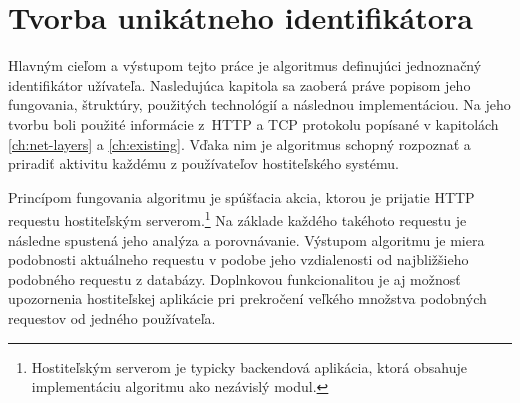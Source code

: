 \documentclass[
  printed, %
  table,   %
  lof,     %
  nolot,   %
  nocover
]{fithesis3}
\begin{document}
\chapter{Tvorba unikátneho identifikátora}
\label{ch:footprint}
Hlavným cieľom a výstupom tejto práce je algoritmus definujúci jednoznačný
identifikátor užívateľa. Nasledujúca kapitola sa zaoberá práve popisom jeho
fungovania, štruktúry, použitých technológií a následnou implementáciou. Na
jeho tvorbu boli použité informácie z~HTTP a TCP protokolu popísané v
kapitolách \ref{ch:net-layers} a \ref{ch:existing}. Vďaka nim je algoritmus
schopný rozpoznať a priradiť aktivitu každému z používateľov hostiteľského
systému.

Princípom fungovania algoritmu je spúšťacia akcia, ktorou je prijatie HTTP requestu
hostiteľským serverom.\footnote{Hostiteľským serverom je typicky backendová
aplikácia, ktorá obsahuje implementáciu algoritmu ako nezávislý modul.} Na
základe každého takéhoto requestu je následne spustená jeho analýza a
porovnávanie. Výstupom algoritmu je miera podobnosti aktuálneho
requestu v podobe jeho vzdialenosti od najbližšieho podobného requestu
z databázy. Doplnkovou funkcionalitou je aj možnosť upozornenia hostiteľskej
aplikácie pri prekročení veľkého množstva podobných requestov od jedného používateľa.
\end{document}
